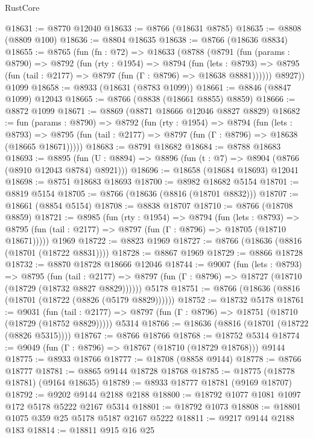 \begin{lexlean}{RustCore}
\begin{coremodule}
@18631 := @8770 @12040
@18633 := @8766 (@18631 @8785)
@18635 := @8808 (@8809 @100)
@18636 := @8804 @18635
@18638 := @8766 (@18636 @8834)
@18655 := @8765
    (fun (fn : @72) =>
    @18633
      (@8788
        (@8791
          (fun (params : @8790) =>
          @8792
            (fun (rty : @1954) =>
            @8794
              (fun (lets : @8793) =>
              @8795 (fun (tail : @2177) => @8797 (fun (Γ : @8796) => @18638 @8881))))))
        @8927))
    @1099
@18658 := @8933 (@18631 (@8783 @1099))
@18661 := @8846 (@8847 @1099) @12043
@18665 := @8766 (@8838 (@18661 @8855) @8859)
@18666 := @8872 @1099
@18671 := @8869 (@8871 @18666 @12046 @8827 @8829)
@18682 := fun (params : @8790) =>
  @8792
    (fun (rty : @1954) =>
    @8794
      (fun (lets : @8793) =>
      @8795 (fun (tail : @2177) => @8797 (fun (Γ : @8796) => @18638 (@18665 @18671)))))
@18683 := @8791 @18682
@18684 := @8788 @18683
@18693 := @8895
    (fun (U : @8894) => @8896 (fun (t : @7) => @8904 (@8766 (@8910 @12043 @8784) @8921)))
@18696 := @18658 (@18684 @18693) @12041
@18698 := @8751 @18683 @18693
@18700 := @8982 @18682 @5154
@18701 := @8819 @5154
@18705 := @8766 (@18636 (@8816 (@18701 @8832)))
@18707 := @18661 (@8854 @5154)
@18708 := @8838 @18707
@18710 := @8766 (@18708 @8859)
@18721 := @8985
    (fun (rty : @1954) =>
    @8794
      (fun (lets : @8793) =>
      @8795 (fun (tail : @2177) => @8797 (fun (Γ : @8796) => @18705 (@18710 @18671)))))
    @1969
@18722 := @8823 @1969
@18727 := @8766 (@18636 (@8816 (@18701 (@18722 @8831))))
@18728 := @8867 @1969
@18729 := @8866 @18728
@18732 := @8870 @18728 @18666 @12046
@18744 := @9007
    (fun (lets : @8793) =>
    @8795
      (fun (tail : @2177) =>
      @8797 (fun (Γ : @8796) => @18727 (@18710 (@18729 (@18732 @8827 @8829))))))
    @5178
@18751 := @8766 (@18636 (@8816 (@18701 (@18722 (@8826 (@5179 @8829))))))
@18752 := @18732 @5178
@18761 := @9031
    (fun (tail : @2177) => @8797 (fun (Γ : @8796) => @18751 (@18710 (@18729 (@18752 @8829)))))
    @5314
@18766 := @18636 (@8816 (@18701 (@18722 (@8826 @5315))))
@18767 := @8766 @18766
@18768 := @18752 @5314
@18774 := @9049 (fun (Γ : @8796) => @18767 (@18710 (@18729 @18768))) @9144
@18775 := @8933 @18766
@18777 := @18708 (@8858 @9144)
@18778 := @8766 @18777
@18781 := @8865 @9144 @18728 @18768
@18785 := @18775 (@18778 @18781) (@9164 @18635)
@18789 := @8933 @18777 @18781 (@9169 @18707)
@18792 := @9202 @9144 @2188 @2188
@18800 := @18792 @1077 @1081 @1097 @172 @5178 @5222 @2167 @5314
@18801 := @18792 @1073
@18808 := @18801 @1075 @359 @25 @5178 @5187 @2167 @5222
@18811 := @9217 @9144 @2188 @183
@18814 := @18811 @915 @16 @25

\end{coremodule}
\end{lexlean}
